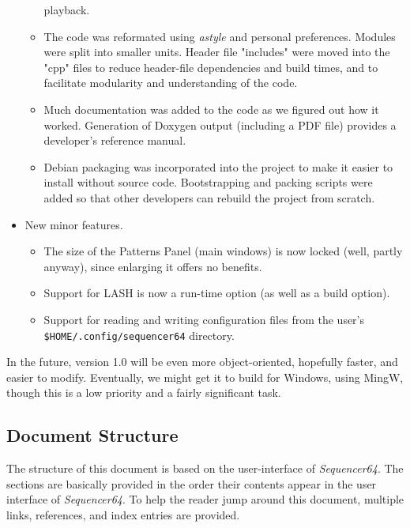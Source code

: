 \documentclass[
 11pt,
 twoside,
 a4paper,
 headinclude,
 footinclude,
 final                                 %
]{article}
\begin{document}
\begin{itemize}
\begin{itemize}
            playback.
         \item The code was reformated using \textsl{astyle} and
            personal preferences.  Modules were split into smaller units.
            Header file "includes" were moved into the "cpp" files to reduce
            header-file dependencies and build times, and to facilitate
            modularity and understanding of the code.
         \item Much documentation was added to the code as we figured
            out how it worked.  Generation of Doxygen output (including a PDF
            file) provides a developer's reference manual.
         \item Debian packaging was incorporated into the project to make it
            easier to install without source code.  Bootstrapping and
            packing scripts were added so that other developers can rebuild the
            project from scratch.
      \end{itemize}
      \item New minor features.
      \begin{itemize}
         \item The size of the Patterns Panel (main windows) is now locked
            (well, partly anyway), since enlarging it offers no benefits.
         \item Support for LASH is now a run-time option (as well as a build
            option).
         \item Support for reading and writing configuration files from the
            user's \texttt{\$HOME/.config/sequencer64} directory.
      \end{itemize}
   \end{itemize}

   In the future, version 1.0 will be even more object-oriented, hopefully
   faster, and easier to modify.  Eventually, we might get it to build
   for Windows, using MingW, though this is a low priority and a fairly
   significant task.

\subsection{Document Structure}
\label{subsec:introduction_document_structure}

   The structure of this document is based on the user-interface of
   \textsl{Sequencer64}.  The sections are basically provided in the order
   their contents appear in the user interface of \textsl{Sequencer64}.  To
   help the reader jump around this document, multiple links, references,
   and index entries are provided.
\end{document}
